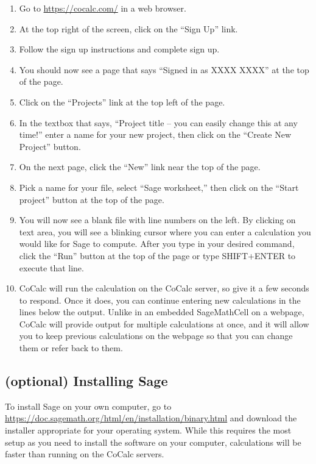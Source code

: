 \begin{enumerate}
	\item Go to \url{https://cocalc.com/} in a web browser.
	\item At the top right of the screen, click on the ``Sign Up''
		link.
	\item Follow the sign up instructions and complete
		sign up.
	\item You should now see a page that says ``Signed in as
		XXXX XXXX'' at the top of the page.
	\item Click on the ``Projects'' link at the top left of the page.
	\item In the textbox that says, ``Project title -- you can easily change
		this at any time!'' enter a name for your new project, then
		click on the ``Create New Project'' button.
	\item On the next page, click the ``New'' link near the top
		of the page.
	\item Pick a name for your file, select ``Sage worksheet,''
		then click on the ``Start project'' button at the top of the page.
	\item You will now see a blank file with line numbers on the left.
		By clicking on text area, you will see a blinking cursor where you
		can enter a calculation you would like for Sage to compute.
		After you type in your desired command, click the ``Run'' button
		at the top of the page or type SHIFT$+$ENTER to execute
		that line.
	\item CoCalc will run the calculation on the CoCalc server, so give it
		a few seconds to respond. Once it does, you can continue entering
		new calculations in the lines below the output. Unlike in an
		embedded SageMathCell on a webpage, CoCalc will provide
		output for multiple calculations at once, and it will allow you to
		keep previous calculations on the webpage so that you can
		change them or refer back to them.
\end{enumerate}

\subsection{(optional) Installing Sage}

To install Sage on your own computer, go to
\url{https://doc.sagemath.org/html/en/installation/binary.html} and
download the installer appropriate for your operating system.
While this requires the most setup as you need to install the
software on your computer, calculations will be faster than
running on the CoCalc servers.

